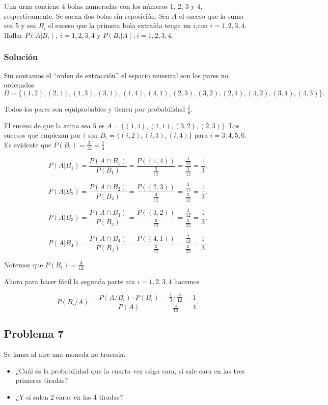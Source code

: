 \documentclass[
]{article}
\providecommand{\tightlist}{%
  \setlength{\itemsep}{0pt}\setlength{\parskip}{0pt}}
\begin{document}
Una urna contiene 4 bolas numeradas con los números 1, 2, 3 y 4,
respectivamente. Se sacan dos bolas sin reposición. Sea \(A\) el suceso
que la suma sea 5 y sea \(B_i\) el suceso que la primera bola extraída
tenga un \(i\),con \(i=1,2,3,4\). Hallar \(P(A|B_i),\  i=1,2,3,4\) y
\(P(B_i|A), i=1,2,3,4\).

\hypertarget{soluciuxf3n-6}{%
\subsubsection{Solución}\label{soluciuxf3n-6}}

Sin contamos el ``orden de extracción'' el espacio muestral son los
pares no ordenados
\[\Omega =\{(1,2),(2,1),(1,3),(3,1),(1,4),(4,1),(2,3),(3,2),(2,4),(4,2),(3,4),(4,3)\}.\]

Todos los pares son equiprobables y tienen por probabilidad
\(\frac{1}{6}.\)

El suceso de que la suma sea 5 es \(A=\{(1,4),(4,1),(3,2),(2,3)\}\). Los
sucesos que empiezan por \(i\) son \(B_i=\{(i,2),(i,3),(i,4)\}\) para
\(i=3,4,5,6.\) Es evidente que \(P(B_i)=\frac{3}{12}=\frac{1}{4}\)

\[
P(A|B_1)=\frac{P(A\cap B_1)}{P(B_1)}=\frac{P((1,4))}{\frac{3}{12}}=
\frac{\frac{1}{12}}{\frac{3}{12}}=\frac{1}{3}.
\]

\[
P(A|B_2)=\frac{P(A\cap B_2)}{P(B_2)}=\frac{P((2,3))}{\frac{4}{12}}=
\frac{\frac{1}{12}}{\frac{3}{12}}=\frac{1}{3}.
\]

\[
P(A|B_3)=\frac{P(A\cap B_3)}{P(B_3)}=\frac{P((3,2))}{\frac{3}{12}}=
\frac{\frac{1}{12}}{\frac{3}{12}}=\frac{1}{3}.
\]

\[P(A|B_4)=\frac{P(A\cap B_4)}{P(B_4)}=\frac{P((4,1))}{\frac{3}{12}}=
\frac{\frac{1}{12}}{\frac{3}{12}}=\frac{1}{3}.\]

Notemos que \(P(B_i)=\frac{3}{12}.\)

Ahora para hacer fácil la segunda parte ara \(i=1,2,3,4\) hacemos

\[
P(B_i/A)=\frac{P(A/B_i)\cdot P(B_i)}{P(A)}=\frac{\frac{1}{3}\cdot \frac{3}{12}}{\frac{4}{12}}=\frac{1}{4}.
\]

\hypertarget{problema-7}{%
\subsection{Problema 7}\label{problema-7}}

Se lanza al aire una moneda no trucada.

\begin{itemize}
\tightlist
\item
  ¿Cuál es la probabilidad que la cuarta vez salga cara, si sale cara en
  las tres primeras tiradas?
\item
  ¿Y si salen 2 caras en las 4 tiradas?
\end{itemize}
\end{document}
